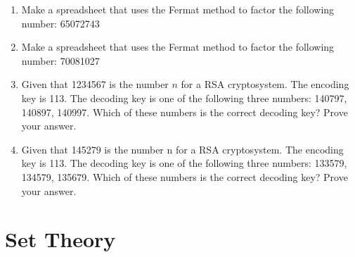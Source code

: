 \begin{enumerate}
\item 
Make a spreadsheet that uses the Fermat method to factor the following number: 65072743

\item 	
Make a spreadsheet that uses the Fermat method to factor the following number: 70081027

\item	
Given that 1234567 is the number $n$ for a RSA cryptosystem.  The encoding key is 113. The decoding key is one of the following three numbers: 140797, 140897, 140997. Which of these numbers is the correct decoding key? Prove your answer.

\item
Given that 145279  is the number n for a RSA cryptosystem.  The encoding key is 113. The decoding key is one of the following three numbers:
133579, 134579, 135679.
Which of these numbers is the correct decoding key? Prove your answer.
	
\end{enumerate}


\section{Set Theory}

